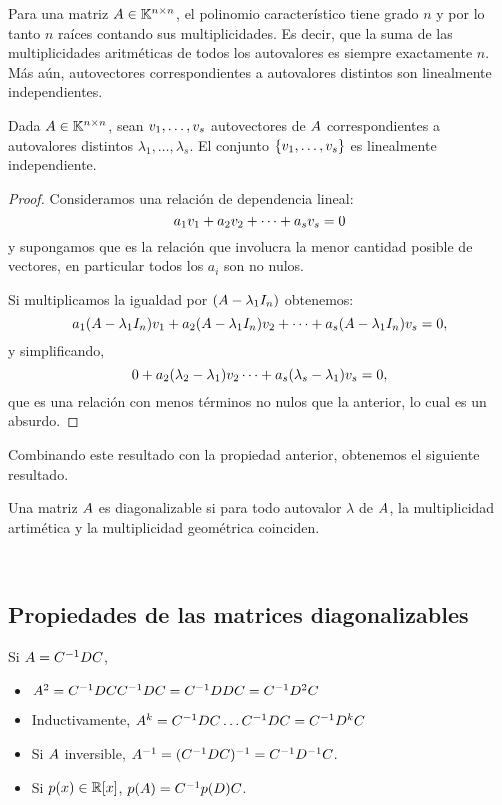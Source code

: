 Para una matriz $\Ab \in \Knn$, el polinomio característico tiene grado $n$ y por lo tanto $n$ raíces contando sus multiplicidades. Es decir, que la suma de las multiplicidades aritméticas de todos los autovalores es siempre exactamente $n$. Más aún, autovectores correspondientes a autovalores distintos son linealmente independientes.

\begin{prop}
Dada $\Ab \in \Knn$, sean $\vb_1, \dots, \vb_s$ autovectores de $\Ab$ correspondientes a autovalores distintos $\lambda_1, \dots, \lambda_s$.
El conjunto $\{\vb_1, \dots, \vb_s\}$ es linealmente independiente.
\end{prop}

\begin{proof}
Consideramos una relación de dependencia lineal:
$$
a_1 \vb_1 + a_2 \vb_2 + \dots + a_s \vb_s = 0
$$
y supongamos que es la relación que involucra la menor cantidad posible de vectores, en particular todos los $a_i$ son no nulos.

Si multiplicamos la igualdad por $(\Ab - \lambda_1 \Ib_n)$ obtenemos:
$$
a_1  (\Ab - \lambda_1 \Ib_n) \vb_1 + a_2 (\Ab - \lambda_1 \Ib_n) \vb_2 + \dots + a_s(\Ab - \lambda_1 \Ib_n)  \vb_s = 0,$$
y simplificando,
$$
0 + a_2 (\lambda_2 - \lambda_1)  \vb_2 \dots + a_s(\lambda_s - \lambda_1)  \vb_s = 0,
$$
que es una relación con menos términos no nulos que la anterior, lo cual es un absurdo.
\end{proof}

Combinando este resultado con la propiedad anterior, obtenemos el siguiente resultado.

\begin{prop}
Una matriz $\Ab$ es diagonalizable si para todo autovalor $\lambda$ de $\Ab$, la multiplicidad artimética y la multiplicidad geométrica coinciden.
\end{prop}

\

\subsection{Propiedades de las matrices diagonalizables}

\begin{prop} Si $\Ab = \Cb^{-1} \Db \Cb$,
\begin{itemize}
\item   $\Ab^2 = \Cb^{-1} \Db \Cb \Cb^{-1} \Db \Cb = \Cb^{-1} \Db \Db \Cb = \Cb^{-1} \Db^2 \Cb$
\item   Inductivamente, $\Ab^k = \Cb^{-1} \Db \Cb \dots \Cb^{-1} \Db \Cb = \Cb^{-1} \Db^k \Cb$
\item   Si $\Ab$ inversible, $\Ab^{-1} = (\Cb^{-1} \Db \Cb)^{-1} = \Cb^{-1} \Db^{-1} \Cb$.
\item   Si $p(x) \in \mathbb R[x]$, $p(\Ab) = \Cb^{-1} p(\Db) \Cb$.
\end{itemize}
\end{prop}

